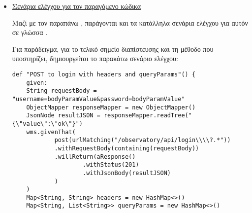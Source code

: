 \begin{itemize}
\begin{lstlisting}[language=java]
    Map<String, Object> bodyHeaders = new HashMap<>();

    try {
        System.out.println("Sending " + request.method() + " to " + request.uri());
        HttpResponse<InputStream> response = client.send(request, HttpResponse.BodyHandlers.ofInputStream());
        int statusCode = response.statusCode();
        if (statusCode == 200 || statusCode == 201) {
            try {
                if (bodyProcessor != null) {
                    bodyHeaders.put("headers", response.headers().map());
                    bodyHeaders.put("body", bodyProcessor.apply(new InputStreamReader(response.body(), StandardCharsets.UTF_8)));
                    return bodyHeaders;
                }
                else {
                    return null;
                }
            }
            catch(Exception e) {
                throw new ResponseProcessingException(e.getMessage(), e);
            }
        }
        else {
            throw new ServerResponseException(statusCode, ClientHelper.readContents(response.body()));
        }
    }
    catch(IOException | InterruptedException e) {
        throw new ConnectionException(e.getMessage(), e);
    }
}  
\end{lstlisting}

Η παραπάνω διαδικασία υποστηρίζει αιτήσεις που έχουν μορφή .
Με όμοιο τρόπο παράγονται για  και για .
        
        \item \underline{Σενάρια ελέγχου για τον παραγόμενο κώδικα}
        
        Μαζί με τον παραπάνω ,
        παράγονται και τα κατάλληλα σενάρια ελέγχου για αυτόν σε γλώσσα .

        Για παράδειγμα, για το τελικό σημείο διαπίστευσης και τη μέθοδο  που υποστηρίζει,
        δημιουργείται το παρακάτω σενάριο ελέγχου:
\begin{lstlisting}[deletekeywords={api,body}]
def "POST to login with headers and queryParams"() {
    given:
    String requestBody = "username=bodyParamValue&password=bodyParamValue"
    ObjectMapper responseMapper = new ObjectMapper()
    JsonNode resultJSON = responseMapper.readTree("{\"value\":\"ok\"}")
    wms.givenThat(
            post(urlMatching("/observatory/api/login\\\\?.*"))
            .withRequestBody(containing(requestBody))
            .willReturn(aResponse()
                    .withStatus(201)
                    .withJsonBody(resultJSON)
            )
    )
    Map<String, String> headers = new HashMap<>()
    Map<String, List<String>> queryParams = new HashMap<>()


\end{lstlisting}
\end{itemize}
